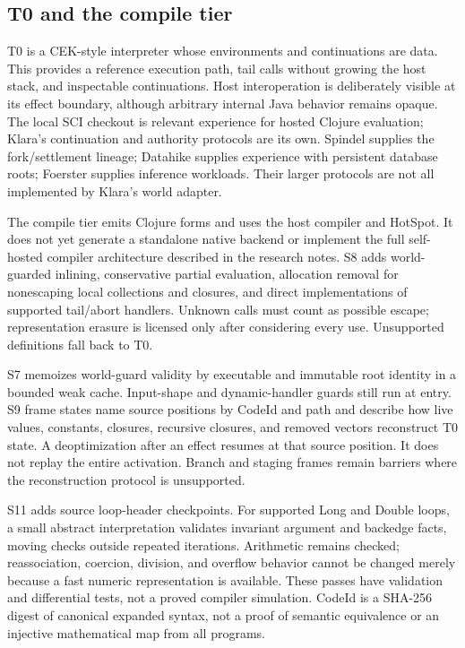 \documentclass[acmsmall,screen,review,nonacm]{acmart}
\begin{document}
\subsection{T0 and the compile tier}
T0 is a CEK-style interpreter whose environments and continuations are data.
This provides a reference execution path, tail calls without growing the host
stack, and inspectable continuations. Host interoperation is deliberately
visible at its effect boundary, although arbitrary internal Java behavior
remains opaque. The local SCI checkout is relevant experience for hosted
Clojure evaluation; Klara's continuation and authority protocols are its own.
Spindel supplies the fork/settlement lineage; Datahike supplies experience with
persistent database roots; Foerster supplies inference workloads. Their larger
protocols are not all implemented by Klara's world adapter.

The compile tier emits Clojure forms and uses the host compiler and HotSpot.
It does not yet generate a standalone native backend or implement the full
self-hosted compiler architecture described in the research notes. S8 adds
world-guarded inlining, conservative partial evaluation, allocation removal
for nonescaping local collections and closures, and direct implementations of
supported tail/abort handlers. Unknown calls must count as possible escape;
representation erasure is licensed only after considering every use.
Unsupported definitions fall back to T0.

S7 memoizes world-guard validity by executable and immutable root identity in
a bounded weak cache. Input-shape and dynamic-handler guards still run at
entry. S9 frame states name source positions by CodeId and path and describe
how live values, constants, closures, recursive closures, and removed vectors
reconstruct T0 state. A deoptimization after an effect resumes at that source
position. It does not replay the entire activation. Branch and staging frames
remain barriers where the reconstruction protocol is unsupported.

S11 adds source loop-header checkpoints. For supported Long and Double loops,
a small abstract interpretation validates invariant argument and backedge
facts, moving checks outside repeated iterations. Arithmetic remains checked;
reassociation, coercion, division, and overflow behavior cannot be changed
merely because a fast numeric representation is available. These passes have
validation and differential tests, not a proved compiler simulation. CodeId
is a SHA-256 digest of canonical expanded syntax, not a proof of semantic
equivalence or an injective mathematical map from all programs.
\end{document}
